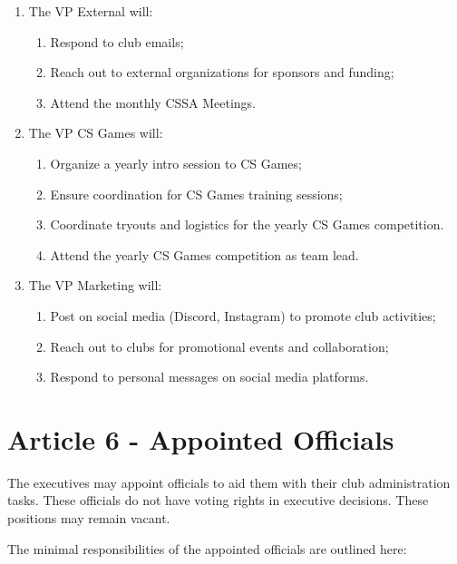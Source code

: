 \begin{enumerate}
    \item The VP External will:
    \begin{enumerate}
        \item Respond to club emails;
        \item Reach out to external organizations for sponsors and funding;
        \item Attend the monthly CSSA Meetings.
    \end{enumerate}

    \item The VP CS Games will:
    \begin{enumerate}
      \item Organize a yearly intro session to CS Games;
      \item Ensure coordination for CS Games training sessions;
      \item Coordinate tryouts and logistics for the yearly CS Games competition.
      \item Attend the yearly CS Games competition as team lead. 
    \end{enumerate}

    \item The VP Marketing will:
    \begin{enumerate}
        \item Post on social media (Discord, Instagram) to promote club activities;
        \item Reach out to clubs for promotional events and collaboration;
        \item Respond to personal messages on social media platforms.
    \end{enumerate}
\end{enumerate}

\section*{Article 6 - Appointed Officials}

The executives may appoint officials to aid them with their club administration tasks. These officials do not have voting rights in executive decisions. These positions may remain vacant.

The minimal responsibilities of the appointed officials are outlined here:

